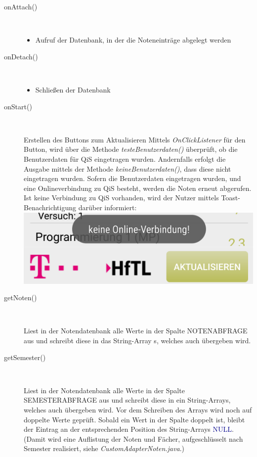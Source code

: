 \begin{description}
\item[onAttach()]~\par
\begin{itemize}
\item Aufruf der Datenbank, in der die Noteneinträge abgelegt werden
\end{itemize}

 
\item[onDetach()]~\par
\begin{itemize}
\item Schließen der Datenbank
\end{itemize}

 
\item[onStart()]~\par
Erstellen des Buttons zum Aktualisieren
Mittels \textit{OnClickListener} für den Button, wird über die Methode \textit{testeBenutzerdaten()} überprüft, ob die Benutzerdaten für QiS eingetragen wurden. Andernfalls erfolgt die Ausgabe mittels der Methode \textit{keineBenutzerdaten()}, dass diese nicht eingetragen wurden. Sofern die Benutzerdaten eingetragen wurden, und eine Onlineverbindung zu QiS besteht, werden die Noten erneut abgerufen. Ist keine Verbindung zu QiS vorhanden, wird der Nutzer mittels Toast-Benachrichtigung darüber informiert:\\
 \includegraphics[scale=0.5]{05_Handbuch/img/Noten_Toast.png}

\item[getNoten()]~\par
Liest in der Notendatenbank alle Werte in der Spalte \textcolor{lila}{NOTENABFRAGE} aus und schreibt diese in das String-Array s, welches auch übergeben wird.
 
\item[getSemester()]~\par
Liest in der Notendatenbank alle Werte in der Spalte \textcolor{lila}{SEMESTERABFRAGE} aus und schreibt diese in ein String-Arrays, welches auch übergeben wird. Vor dem Schreiben des Arrays wird noch auf doppelte Werte geprüft. Sobald ein Wert in der Spalte doppelt ist, bleibt der Eintrag an der entsprechenden Position des String-Arrays \textcolor{darkblue}{NULL}. (Damit wird eine Auflistung der Noten und Fächer, aufgeschlüsselt nach Semester realisiert, siehe \textit{CustomAdapterNoten.java}.)
 

\end{description}

